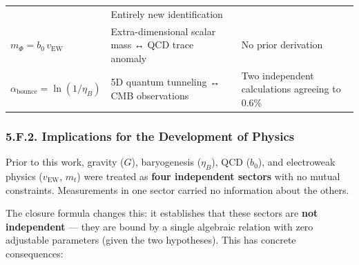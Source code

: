 \documentclass[
  11pt,
]{article}
\begin{document}
\begin{longtable}[]{@{}lll@{}}
\begin{minipage}[t]{0.30\columnwidth}
\end{minipage} & \begin{minipage}[t]{0.42\columnwidth}\raggedright
Entirely new identification\strut
\end{minipage}\tabularnewline
\begin{minipage}[t]{0.19\columnwidth}\raggedright
\(m_\Phi = b_0\,v_{\text{EW}}\)\strut
\end{minipage} & \begin{minipage}[t]{0.30\columnwidth}\raggedright
Extra-dimensional scalar mass ↔ QCD trace anomaly\strut
\end{minipage} & \begin{minipage}[t]{0.42\columnwidth}\raggedright
No prior derivation\strut
\end{minipage}\tabularnewline
\begin{minipage}[t]{0.19\columnwidth}\raggedright
\(\alpha_{\text{bounce}} = \ln(1/\eta_B)\)\strut
\end{minipage} & \begin{minipage}[t]{0.30\columnwidth}\raggedright
5D quantum tunneling ↔ CMB observations\strut
\end{minipage} & \begin{minipage}[t]{0.42\columnwidth}\raggedright
Two independent calculations agreeing to 0.6\%\strut
\end{minipage}\tabularnewline
\bottomrule
\end{longtable}

\hypertarget{f.2.-implications-for-the-development-of-physics}{%
\subsubsection{5.F.2. Implications for the Development of
Physics}\label{f.2.-implications-for-the-development-of-physics}}

Prior to this work, gravity (\(G\)), baryogenesis (\(\eta_B\)), QCD
(\(b_0\)), and electroweak physics (\(v_{\text{EW}}\), \(m_t\)) were
treated as \textbf{four independent sectors} with no mutual constraints.
Measurements in one sector carried no information about the others.

The closure formula changes this: it establishes that these sectors are
\textbf{not independent} --- they are bound by a single algebraic
relation with zero adjustable parameters (given the two hypotheses).
This has concrete consequences:
\end{document}
